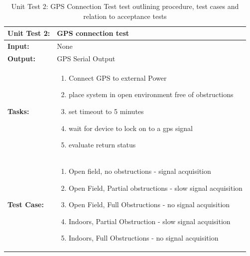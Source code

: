 \begin{table}[H]
    \centering
    \caption{Unit Test 2: GPS Connection Test  test outlining procedure, test cases and relation to acceptance tests}
    \begin{tabular}{|m{}|m{}|}
    \hline
       \textbf{Unit Test 2: }  &  GPS connection test\\
       \hline
        \textbf{Input: } &  None\\
        \hline
        \textbf{Output: } & GPS Serial Output\\
        \hline
        \textbf{Tasks: } & \begin{enumerate}
        \vspace{1mm}
            \item Connect GPS to external Power
            \item place system in open environment free of obstructions
            \item set timeout to 5 minutes
            \item wait for device to lock on to a gps signal
            \item evaluate return status
        \end{enumerate}\\
        \hline
        \textbf{Test Case: } & \begin{enumerate}
            \vspace{1mm}
            \item Open field, no obstructions - signal acquisition
            \item Open Field, Partial obstructions - slow signal acquisition
            \item Open Field, Full Obstructions - no signal acquisition
            \item Indoors, Partial Obstruction - slow signal acquisition
            \item Indoors, Full Obstructions - no signal acquisition
        \end{enumerate}\\
        \hline

    \end{tabular}
    \label{tab:UT002}
\end{table}


